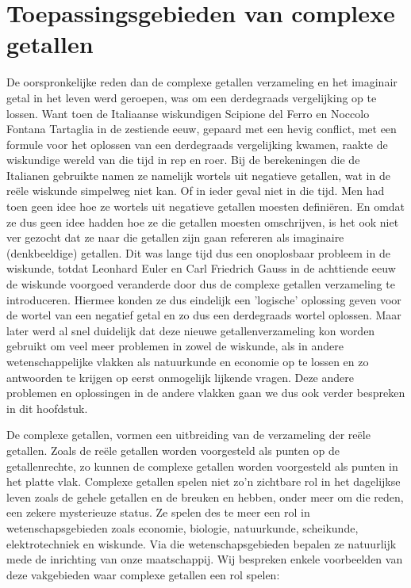 \documentclass[11pt,fleqn]{book} %
\begin{document}

\chapter{Toepassingsgebieden van complexe getallen}
De oorspronkelijke reden dan de complexe getallen verzameling en het imaginair getal in het leven werd geroepen, was om een derdegraads vergelijking op te lossen. Want toen de Italiaanse wiskundigen Scipione del Ferro en Noccolo Fontana Tartaglia in de zestiende eeuw, gepaard met een hevig conflict, met een formule voor het oplossen van een derdegraads vergelijking kwamen, raakte de wiskundige wereld van die tijd in rep en roer. Bij de berekeningen die de Italianen gebruikte namen ze namelijk wortels uit negatieve getallen, wat in de reële wiskunde simpelweg niet kan. Of in ieder geval niet in die tijd. Men had toen geen idee hoe ze wortels uit negatieve getallen moesten definiëren. En omdat ze dus geen idee hadden hoe ze die getallen moesten omschrijven, is het ook niet ver gezocht dat ze naar die getallen zijn gaan refereren als imaginaire (denkbeeldige) getallen.
Dit was lange tijd dus een onoplosbaar probleem in de wiskunde, totdat Leonhard Euler en Carl Friedrich Gauss in de achttiende eeuw de wiskunde voorgoed veranderde door dus de complexe getallen verzameling te introduceren. Hiermee konden ze dus eindelijk een 'logische' oplossing geven voor de wortel van een negatief getal en zo dus een derdegraads wortel oplossen. 
Maar later werd al snel duidelijk dat deze nieuwe getallenverzameling kon worden gebruikt om veel meer problemen in zowel de wiskunde, als in andere wetenschappelijke vlakken als natuurkunde en economie op te lossen en zo antwoorden te krijgen op eerst onmogelijk lijkende vragen. Deze andere problemen en oplossingen in de andere vlakken gaan we dus ook verder bespreken in dit hoofdstuk.

De complexe getallen, vormen een uitbreiding van de verzameling der reële getallen. Zoals de reële getallen worden voorgesteld als punten op de getallenrechte, zo kunnen de complexe getallen worden voorgesteld als punten in het platte vlak. Complexe getallen spelen niet zo’n zichtbare rol in het dagelijkse leven zoals de gehele getallen en de breuken en hebben, onder meer om die reden, een zekere mysterieuze status. Ze spelen des te meer een rol in wetenschapsgebieden zoals economie, biologie, natuurkunde, scheikunde, elektrotechniek en wiskunde. Via die wetenschapsgebieden bepalen ze natuurlijk mede de inrichting van onze maatschappij. Wij bespreken enkele voorbeelden van deze vakgebieden waar complexe getallen een rol spelen:
\end{document}
